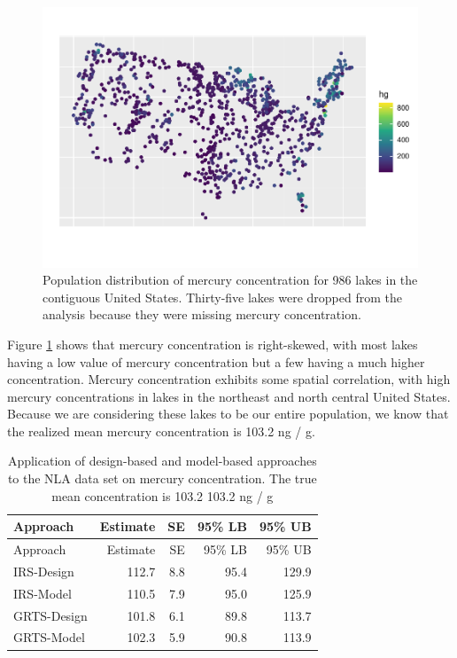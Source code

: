 \documentclass[]{elsarticle} %
\begin{document}
\begin{figure}
\includegraphics[width=1\linewidth]{manuscript_files/figure-latex/figdata-1} \caption{Population distribution of mercury concentration for 986 lakes in the contiguous United States. Thirty-five lakes were dropped from the analysis because they were missing mercury concentration.}\label{fig:figdata}
\end{figure}

Figure \ref{fig:figdata} shows that mercury concentration is
right-skewed, with most lakes having a low value of mercury
concentration but a few having a much higher concentration. Mercury
concentration exhibits some spatial correlation, with high mercury
concentrations in lakes in the northeast and north central United
States. Because we are considering these lakes to be our entire
population, we know that the realized mean mercury concentration is
103.2 ng / g.

\begin{longtable}[]{@{}lrrrr@{}}
\caption{\label{tab:appliedtab} Application of design-based and
model-based approaches to the NLA data set on mercury concentration. The
true mean concentration is 103.2 103.2 ng / g}\tabularnewline
\toprule
Approach & Estimate & SE & 95\% LB & 95\% UB\tabularnewline
\midrule
\endfirsthead
\toprule
Approach & Estimate & SE & 95\% LB & 95\% UB\tabularnewline
\midrule
\endhead
IRS-Design & 112.7 & 8.8 & 95.4 & 129.9\tabularnewline
IRS-Model & 110.5 & 7.9 & 95.0 & 125.9\tabularnewline
GRTS-Design & 101.8 & 6.1 & 89.8 & 113.7\tabularnewline
GRTS-Model & 102.3 & 5.9 & 90.8 & 113.9\tabularnewline
\bottomrule
\end{longtable}
\end{document}
